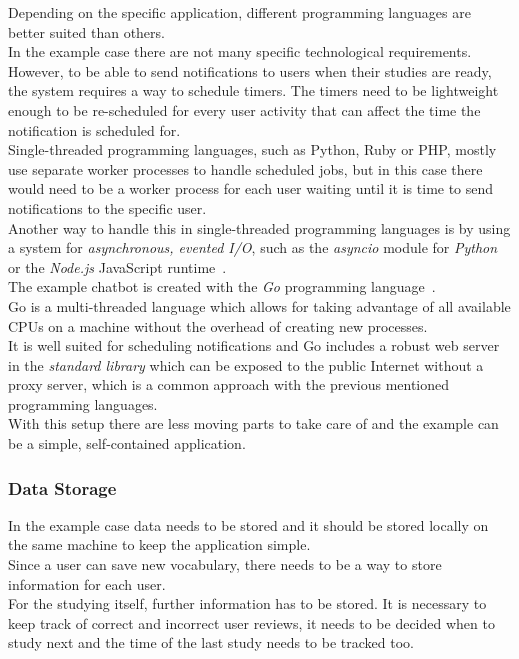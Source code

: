 Depending on the specific application, different programming languages are better suited than others.
\\
In the example case there are not many specific technological requirements.
\\
However, to be able to send notifications to users when their studies are ready,
the system requires a way to schedule timers.
The timers need to be lightweight enough to be re-scheduled for every user activity
that can affect the time the notification is scheduled for.
\\
Single-threaded programming languages, such as Python, Ruby or PHP,
mostly use separate worker processes to handle scheduled jobs,
but in this case there would need to be a worker process for each user
waiting until it is time to send notifications to the specific user.
\\
Another way to handle this in single-threaded programming languages is by using a system for \emph{asynchronous, evented I/O},
such as the \emph{asyncio} module for \emph{Python}~\cite{asyncio} or the \emph{Node.js} JavaScript runtime~\cite{nodejs}.
\\

The example chatbot is created with the \emph{Go} programming language~\cite{golang}.
\\
Go is a multi-threaded language which allows for taking advantage of all available CPUs
on a machine without the overhead of creating new processes.
\\
It is well suited for scheduling notifications and Go includes a robust web server in the \emph{standard library} which can be exposed to the public Internet without a proxy server, which is a common approach with the previous mentioned programming languages.
\\
With this setup there are less moving parts to take care of and the example can be a simple, self-contained application.
\\


\subsubsection{Data Storage}

In the example case data needs to be stored and it should be stored locally on the same machine
to keep the application simple.
\\

Since a user can save new vocabulary,
there needs to be a way to store information for each user.
\\
For the studying itself, further information has to be stored.
It is necessary to keep track of correct and incorrect user reviews, it needs to be decided when to study next and the time of the last study needs to be tracked too.
\\

